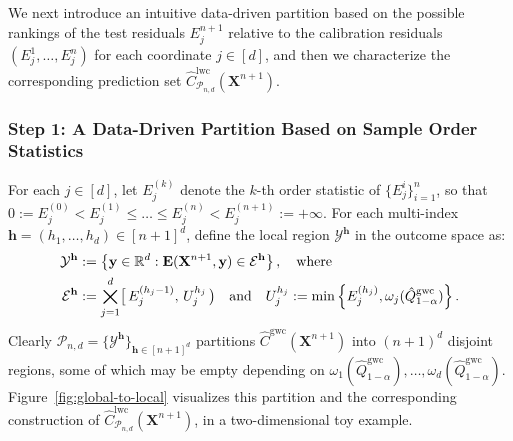 We next introduce an intuitive data-driven partition based on the possible rankings of the test residuals $E_j^{n+1}$ relative to the calibration residuals $(E_j^{1},\ldots,E_j^{n})$ for each coordinate $j \in [d]$, and then we characterize the corresponding prediction set $\hat{C}^{\mathrm{lwc}}_{\mathcal{P}_{n,d}}(\mathbf{X}^{n+1})$.

\subsubsection{Step 1: A Data-Driven Partition Based on Sample Order Statistics}


For each $j \in [d]$, let $E^{(k)}_j$ denote the $k$-th order statistic of $\{{E}^i_j\}_{i=1}^n$, so that $0 := E^{(0)}_j < E^{(1)}_j \leq \ldots \leq E^{(n)}_j < E^{(n+1)}_j := +\infty$. 
For each multi-index $\mathbf{h}=(h_1,\ldots,h_d)\in [n+1]^d$, define the local region $\mathcal{Y}^{\mathbf{h}}$ in the outcome space as:
\begin{equation}\label{eq:rectangle-explicit}
    \begin{aligned}
        \mathcal{Y}^{\mathbf{h}} &:= \left\{\mathbf y \in \mathbb{R}^d: \mathbf E(\mathbf{X}^{n+1}, \mathbf y) \in \mathcal{E}^{\mathbf{h}}\right\}, \quad \text{where}\\
        \mathcal{E}^{\mathbf{h}} &:=  \bigtimes_{j=1}^d \bigl[\,E^{(h_j-1)}_j,\, U^{h_j}_j\,\bigr) \quad\text{and} \quad U^{h_j}_j := \min\left\{E^{(h_j)}_j,  \omega_j(\hat{Q}^{\mathrm{gwc}}_{1-\alpha})\right\}
        .
    \end{aligned}
\end{equation}
Clearly $ \mathcal{P}_{n,d} = \{\mathcal{Y}^{\mathbf{h}}\}_{\mathbf{h}\in[n+1]^d}$ partitions $\hat{C}^\mathrm{gwc}(\mathbf{X}^{n+1})$ into $(n+1)^d$ disjoint regions, some of which may be empty depending on $\omega_1(\hat{Q}^{\mathrm{gwc}}_{1-\alpha}),\ldots,\omega_d(\hat{Q}^{\mathrm{gwc}}_{1-\alpha})$.
Figure~\ref{fig:global-to-local} visualizes this partition and the corresponding construction of $\hat{C}^{\mathrm{lwc}}_{\mathcal{P}_{n,d}}(\mathbf{X}^{n+1})$, in a two-dimensional toy example.

